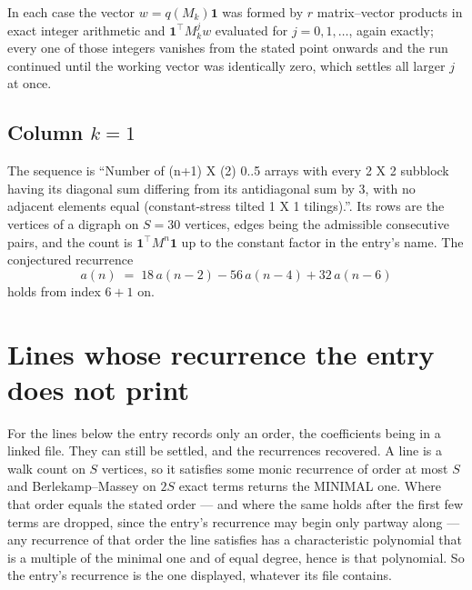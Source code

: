 \documentclass[11pt,a4paper]{article}
\theoremstyle{plain}
\theoremstyle{definition}
\begin{document}
In each case the vector $w=q(M_k)\mathbf{1}$ was formed by $r$ matrix--vector products in
exact integer arithmetic and $\mathbf{1}^{\!\top}M_k^{j}w$ evaluated for $j=0,1,\dots$,
again exactly; every one of those integers vanishes from the stated point onwards and the run
continued until the working vector was identically zero, which settles all larger $j$ at once.

\subsection*{Column $k$$=1$}
The sequence is ``Number of (n+1) X (2) 0..5 arrays with every 2 X 2 subblock having its diagonal sum differing from its antidiagonal sum by 3, with no adjacent elements equal (constant-stress tilted 1 X 1 tilings).''. Its rows are the vertices of a digraph on
$S=30$ vertices, edges being the admissible consecutive pairs, and the count is
$\mathbf{1}^{\!\top}M^{n}\mathbf{1}$ up to the constant factor in the entry's name.
The conjectured recurrence
\[
a(n)\;=\;18\,a(n-2) - 56\,a(n-4) + 32\,a(n-6)
\]
holds from index $6+1$ on.


\section{Lines whose recurrence the entry does not print}

For the lines below the entry records only an order, the coefficients being in a linked file.
They can still be settled, and the recurrences recovered. A line is a walk count on $S$
vertices, so it satisfies some monic recurrence of order at most $S$ and Berlekamp--Massey on
$2S$ exact terms returns the MINIMAL one. Where that order equals the stated order --- and
where the same holds after the first few terms are dropped, since the entry's recurrence may
begin only partway along --- any recurrence of that order the line satisfies has a
characteristic polynomial that is a multiple of the minimal one and of equal degree, hence is
that polynomial. So the entry's recurrence is the one displayed, whatever its file contains.
\end{document}
